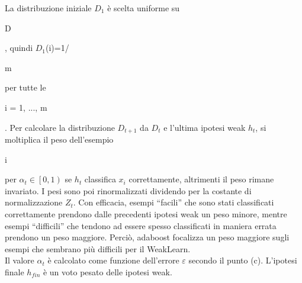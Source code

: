 La distribuzione iniziale \begin{math}D_1\end{math} \`e scelta uniforme su \begin{it}D\end{it}, 
quindi \begin{math}D_1\end{math}(i)=1/\begin{it}m\end{it} per tutte le \begin{it}i = 1, ..., m\end{it}.
Per calcolare la distribuzione \begin{math}D_{t+1}\end{math} da \begin{math}D_t\end{math} e l'ultima 
ipotesi weak \begin{math}h_t\end{math}, si moltiplica il peso dell'esempio \begin{it}i\end{it} per 
\begin{math}\alpha_t \in \left[0,1\right)\end{math} se \begin{math}h_t\end{math} classifica \begin{math}x_i\end{math} correttamente, 
altrimenti il peso rimane invariato. I pesi sono poi rinormalizzati dividendo per la costante di normalizzazione
 \begin{math}Z_t\end{math}. 
Con efficacia, esempi ``facili'' che sono stati classificati correttamente prendono 
dalle precedenti ipotesi weak
un peso minore, mentre esempi ``difficili''  che tendono ad essere spesso classificati in 
maniera errata prendono 
un peso maggiore. Perci\`o, adaboost focalizza un peso maggiore sugli esempi che sembrano pi\`u difficili 
per il WeakLearn. \\
\newline
Il valore \begin{math}\alpha_t\end{math} \`e calcolato come funzione dell'errore 
\begin{math}\varepsilon\end{math} secondo il punto (c).  
L'ipotesi finale \begin{math}h_{fin}\end{math} \`e un voto pesato delle ipotesi weak. 
